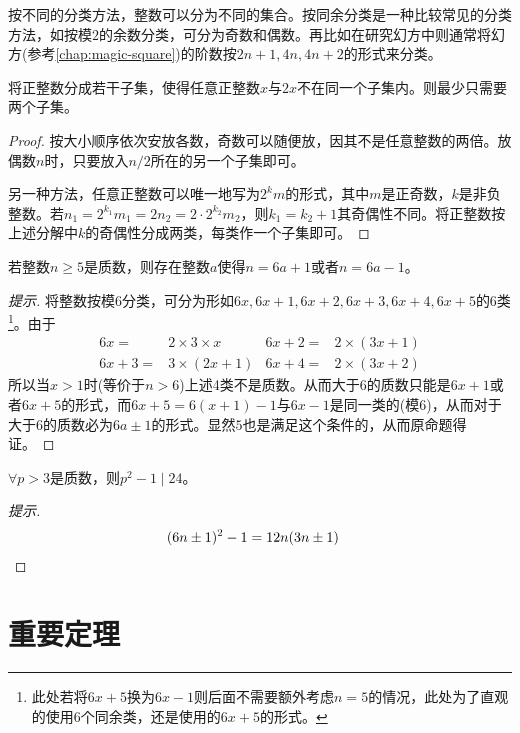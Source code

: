 按不同的分类方法，整数可以分为不同的集合。按同余分类是一种比较常见的分类方法，如按模$2$的余数分类，可分为奇数和偶数。再比如在研究幻方中则通常将幻方(参考\ref{chap:magic-square})的阶数按$2n+1, 4n, 4n+2$的形式来分类。

\begin{example}
  将正整数分成若干子集，使得任意正整数$x$与$2x$不在同一个子集内。则最少只需要两个子集。
\end{example}
\begin{proof}
  按大小顺序依次安放各数，奇数可以随便放，因其不是任意整数的两倍。放偶数$n$时，只要放入$n/2$所在的另一个子集即可。

  另一种方法，任意正整数可以唯一地写为$2^km$的形式，其中$m$是正奇数，$k$是非负整数。若$n_1=2^{k_1}m_1 = 2n_2=2\cdot 2^{k_2}m_2$，则$k_1=k_2+1$其奇偶性不同。将正整数按上述分解中$k$的奇偶性分成两类，每类作一个子集即可。
\end{proof}

\begin{example}
  若整数$n\ge5$是质数，则存在整数$a$使得$n=6a+1$或者$n=6a-1$。
\end{example}
\begin{proof}[提示]
  将整数按模6分类，可分为形如$6x, 6x+1, 6x+2, 6x+3, 6x+4, 6x+5$的6类\footnote{此处若将$6x+5$换为$6x-1$则后面不需要额外考虑$n=5$的情况，此处为了直观的使用6个同余类，还是使用的$6x+5$的形式。}。由于
  \begin{align*}
    6x = & 2\times3\times x & 6x+2=&2\times(3x+1)\\
    6x+3=&3\times(2x+1) & 6x+4=&2\times(3x+2)
  \end{align*}
  所以当$x>1$时(等价于$n>6$)上述4类不是质数。从而大于6的质数只能是$6x+1$或者$6x+5$的形式，而$6x+5=6(x+1)-1$与$6x-1$是同一类的(模6)，从而对于大于6的质数必为$6a\pm1$的形式。显然$5$也是满足这个条件的，从而原命题得证。
\end{proof}

\begin{question}
  $\forall p>3$是质数，则$p^2 - 1 \mid 24$。 
\end{question}
\begin{proof}[提示]
  \begin{align*}
    (6n\pm1)^2 - 1 = 12n(3n\pm1)&\qedhere
  \end{align*}
\end{proof}

\section{重要定理}
\label{sec:important-thorems-of-number-theory}

